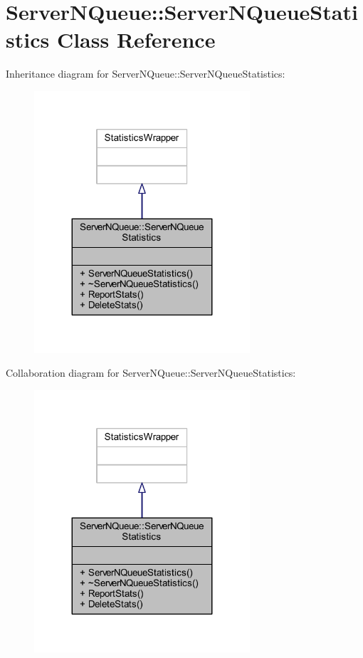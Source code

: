 \hypertarget{class_server_n_queue_1_1_server_n_queue_statistics}{}\section{Server\+N\+Queue\+:\+:Server\+N\+Queue\+Statistics Class Reference}
\label{class_server_n_queue_1_1_server_n_queue_statistics}


Inheritance diagram for Server\+N\+Queue\+:\+:Server\+N\+Queue\+Statistics\+:
\nopagebreak
\begin{figure}[H]
\begin{center}
\leavevmode
\includegraphics[width=227pt]{class_server_n_queue_1_1_server_n_queue_statistics__inherit__graph}
\end{center}
\end{figure}


Collaboration diagram for Server\+N\+Queue\+:\+:Server\+N\+Queue\+Statistics\+:
\nopagebreak
\begin{figure}[H]
\begin{center}
\leavevmode
\includegraphics[width=227pt]{class_server_n_queue_1_1_server_n_queue_statistics__coll__graph}
\end{center}
\end{figure}
